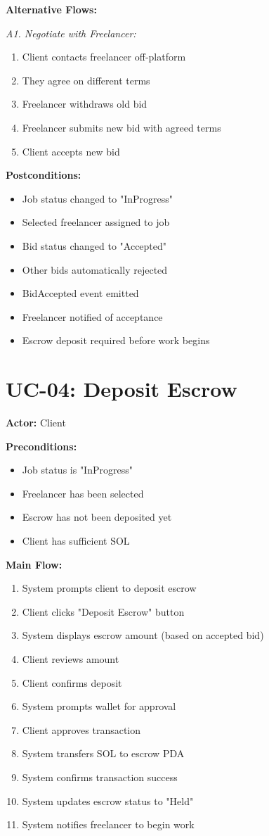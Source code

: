 \documentclass[a4paper,13pt,twoside]{report}
\theoremstyle{definition}
\begin{document}
\textbf{Alternative Flows:}

\textit{A1. Negotiate with Freelancer:}
\begin{enumerate}
    \item Client contacts freelancer off-platform
    \item They agree on different terms
    \item Freelancer withdraws old bid
    \item Freelancer submits new bid with agreed terms
    \item Client accepts new bid
\end{enumerate}

\textbf{Postconditions:}
\begin{itemize}
    \item Job status changed to "InProgress"
    \item Selected freelancer assigned to job
    \item Bid status changed to "Accepted"
    \item Other bids automatically rejected
    \item BidAccepted event emitted
    \item Freelancer notified of acceptance
    \item Escrow deposit required before work begins
\end{itemize}

\section{UC-04: Deposit Escrow}

\textbf{Actor:} Client

\textbf{Preconditions:}
\begin{itemize}
    \item Job status is "InProgress"
    \item Freelancer has been selected
    \item Escrow has not been deposited yet
    \item Client has sufficient SOL
\end{itemize}

\textbf{Main Flow:}
\begin{enumerate}
    \item System prompts client to deposit escrow
    \item Client clicks "Deposit Escrow" button
    \item System displays escrow amount (based on accepted bid)
    \item Client reviews amount
    \item Client confirms deposit
    \item System prompts wallet for approval
    \item Client approves transaction
    \item System transfers SOL to escrow PDA
    \item System confirms transaction success
    \item System updates escrow status to "Held"
    \item System notifies freelancer to begin work
\end{enumerate}
\end{document}
